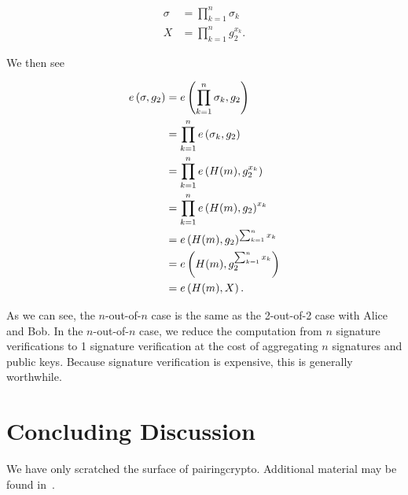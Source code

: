\begin{align}
    \sigma &= \prod_{k=1}^{n} \sigma_{k}
        \nonumber\\
    X &= \prod_{k=1}^{n} g_{2}^{x_{k}}.
\end{align}

\noindent
We then see

\begin{align}
    e\left( \sigma, g_{2} \right) &= e\left( \prod_{k=1}^{n}\sigma_{k}, g_{2} \right)
            \nonumber\\
        &= \prod_{k=1}^{n} e\left( \sigma_{k}, g_{2} \right)
            \nonumber\\
        &= \prod_{k=1}^{n} e\left( H(m), g_{2}^{x_{k}} \right)
            \nonumber\\
        &= \prod_{k=1}^{n} e\left( H(m), g_{2} \right)^{x_{k}}
            \nonumber\\
        &= e\left( H(m), g_{2} \right)^{\sum_{k=1}^{n}x_{k}}
            \nonumber\\
        &= e\left( H(m), g_{2}^{\sum_{k=1}^{n}x_{k}} \right)
            \nonumber\\
        &= e\left( H(m), X \right).
\end{align}

\noindent
As we can see, the $n$-out-of-$n$ case is the same as the 2-out-of-2
case with Alice and Bob.
In the $n$-out-of-$n$ case, we reduce the computation from $n$
signature verifications
to 1 signature verification at the cost of aggregating $n$ signatures
and public keys.
Because signature verification is expensive,
this is generally worthwhile.



\section{Concluding Discussion}

We have only scratched the surface of \gls{pairingcrypto}.
Additional material may be found in~\cite{PairingBasedCrypto}.
